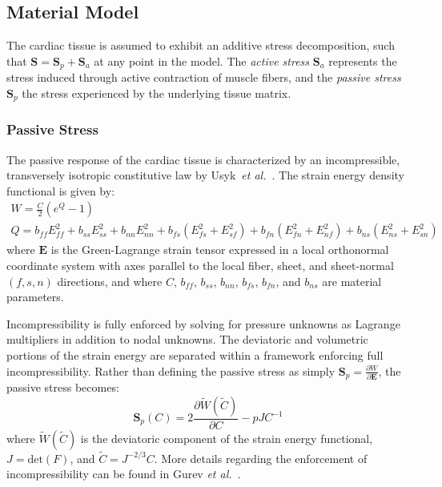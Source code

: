 \subsection{Material Model}
\label{Material Model}

The cardiac tissue is assumed to exhibit an additive stress decomposition, such that $\bm{S} = \bm{S}_p + \bm{S}_a$ at any point in the model. The \textit{active stress} $\bm{S}_a$ represents the stress induced through active contraction of muscle fibers, and the \textit{passive stress} $\bm{S}_p$ the stress experienced by the underlying tissue matrix.

\subsubsection{Passive Stress}
\label{Passive Stress}

The passive response of the cardiac tissue is characterized by an incompressible, transversely isotropic constitutive law by Usyk~\textit{et al.}~\cite{usyk_2002}. The strain energy density functional is given by:
\begin{gather}
W = \frac{C}{2}\left(e^Q -1\right) \\
Q = b_{ff} E^2_{ff} + b_{ss} E^2_{ss} + b_{nn} E^2_{nn} + b_{fs}\left(E^2_{fs} + E^2_{sf}\right) + b_{fn}\left(E^2_{fn} + E^2_{nf}\right) + b_{ns}\left(E^2_{ns} + E^2_{sn}\right)
\end{gather}
where $\mathbf{E}$ is the Green-Lagrange strain tensor expressed in a local orthonormal coordinate system with axes parallel to the local fiber, sheet, and sheet-normal $(f,s,n)$ directions, and where $C$, $b_{ff}$, $b_{ss}$, $b_{nn}$, $b_{fs}$, $b_{fn}$, and $b_{ns}$ are material parameters.

Incompressibility is fully enforced by solving for pressure unknowns as Lagrange multipliers in addition to nodal unknowns. The deviatoric and volumetric portions of the strain energy are separated within a framework enforcing full incompressibility. Rather than defining the passive stress as simply $\bm{S}_p = \frac{\partial W}{\partial \mathbf{E}}$, the passive stress becomes:
\begin{equation}
\bm{S}_p(C)= 2\frac{\partial{\tilde{W}(\tilde{C})}}{\partial{C}} - pJC^{-1}
\end{equation}
where $\tilde{W}(\tilde{C})$ is the deviatoric component of the strain energy functional, $J = \text{det}(F)$, and $\tilde{C} = J^{-2/3}C$. More details regarding the enforcement of incompressibility can be found in Gurev \textit{et al.}~\cite{gurev_2015}.

